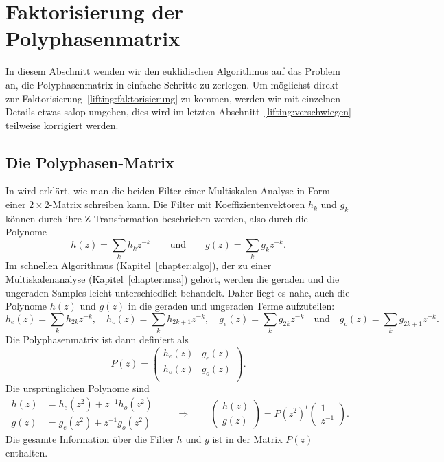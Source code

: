 %
%
\section{Faktorisierung der Polyphasenmatrix}
In diesem Abschnitt wenden wir den euklidischen Algorithmus auf das
Problem an, die Polyphasenmatrix in einfache Schritte zu zerlegen.
Um möglichst direkt zur Faktorisierung~\eqref{lifting:faktorisierung}
zu kommen, werden wir mit einzelnen Details etwas salop umgehen, dies wird
im letzten Abschnitt~\ref{lifting:verschwiegen} teilweise korrigiert werden.

\subsection{Die Polyphasen-Matrix}
In \cite{fpga:Daubechies1998} wird erklärt, wie man die beiden
Filter einer Multiskalen-Analyse in Form einer $2\times 2$-Matrix
schreiben kann.
Die Filter mit Koeffizientenvektoren $h_k$ und $g_k$ können durch 
ihre Z-Transformation beschrieben werden, also durch die Polynome
\[
h(z) = \sum_{k} h_kz^{-k}
\qquad\text{und}\qquad
g(z) = \sum_{k} g_kz^{-k}.
\]
Im schnellen Algorithmus (Kapitel~\ref{chapter:algo}), der zu einer
Multiskalenanalyse (Kapitel~\ref{chapter:msa}) gehört, werden die
geraden und die ungeraden Samples leicht unterschiedlich behandelt.
Daher liegt es nahe, auch die Polynome $h(z)$ und $g(z)$ in die
geraden und ungeraden Terme aufzuteilen:
\[
h_e(z) = \sum_k h_{2k}z^{-k},
\quad
h_o(z) = \sum_k h_{2k+1}z^{-k},
\quad
g_e(z) = \sum_k g_{2k}z^{-k}
\quad\text{und}\quad
g_o(z) = \sum_k g_{2k+1}z^{-k}.
\]
Die Polyphasenmatrix ist dann definiert als
\[
P(z)
=
\begin{pmatrix}
h_e(z)&g_e(z)\\
h_o(z)&g_o(z)\\
\end{pmatrix}.
\]
Die ursprünglichen Polynome sind
\[
\begin{aligned}
h(z) &= h_e(z^2) + z^{-1}h_o(z^2)\\
g(z) &= g_e(z^2) + z^{-1}g_o(z^2)
\end{aligned}
\qquad\Rightarrow\qquad
\begin{pmatrix}
h(z)\\
g(z)
\end{pmatrix}
=
P(z^2)^t
\begin{pmatrix} 1\\ z^{-1} \end{pmatrix}.
\]
Die gesamte Information über die Filter $h$ und $g$ ist in der Matrix
$P(z)$ enthalten.


